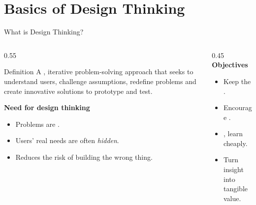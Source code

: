 
\section{Basics of Design Thinking}

\begin{frame}{What is Design Thinking?}
  \accentrule\\[0.3em]
  \begin{columns}[T]
    \begin{column}{0.55\textwidth}\small
      \begin{block}{Definition}\small
        A , iterative problem-solving approach that seeks
        to understand users, challenge assumptions, redefine problems and
        create innovative solutions to prototype and test.
      \end{block}
      \textbf{Need for design thinking}
      \begin{itemize}\small
        \item Problems are .
        \item Users' real needs are often \emph{hidden}.
        \item Reduces the risk of building the wrong thing.
      \end{itemize}
    \end{column}
    \begin{column}{0.45\textwidth}\small
      \textbf{Objectives}
      \begin{itemize}\small
        \item Keep the .
        \item Encourage .
        \item {}, learn cheaply.
        \item Turn insight into tangible value.
      \end{itemize}
    \end{column}
  \end{columns}
\end{frame}

